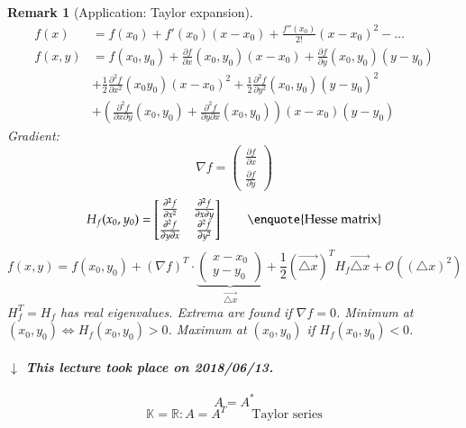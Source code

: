 \documentclass{article}
\newcounter{lecref}[section]
\numberwithin{lecref}{section}
\newtheorem{remark}[lecref]{Remark}
\newcommand{\dateref}[1]{%
  \begin{mdframed}[backgroundcolor=gray!10,innerbottommargin=0pt,innertopmargin=0pt]
    \paragraph{\textit{$\downarrow$ This lecture took place on #1.}}%
  \end{mdframed}%
}
\begin{document}
\begin{remark}[Application: Taylor expansion]
  \begin{align*}
    f(x) &= f(x_0) + f'(x_0)(x - x_0) + \frac{f''(x_0)}{2!} (x - x_0)^2 - \dots \\
    f(x,y) &= f(x_0, y_0) + \frac{\partial f}{\partial x} (x_0, y_0)(x - x_0) + \frac{\partial f}{\partial y} (x_0, y_0)(y - y_0) \\
      &+ \frac12 \frac{\partial^2 f}{\partial x^2} (x_0 y_0)(x - x_0)^2 + \frac12 \frac{\partial^2 f}{\partial y^2} (x_0, y_0) (y - y_0)^2 \\
      &+ \left(\frac{\partial^2 f}{\partial x \partial y} (x_0, y_0) + \frac{\partial^2 f}{\partial y \partial x} (x_0, y_0)\right) (x - x_0) (y - y_0)
  \end{align*}
  Gradient:
  \[ \nabla f = \begin{pmatrix} \frac{\partial f}{\partial x} \\ \frac{\partial f}{\partial y} \end{pmatrix} \]
  \[ H_f(x_0, y_0) = \begin{bmatrix}
      \frac{\partial^2 f}{\partial x^2} & \frac{\partial^2 f}{\partial x \partial y} \\
      \frac{\partial^2 f}{\partial y \partial x} & \frac{\partial^2 f}{\partial y^2}
    \end{bmatrix} \qquad \text{\enquote{Hesse matrix}}
  \] \[
    f(x, y) = f(x_0, y_0) + (\nabla f)^T \cdot \underbrace{\begin{pmatrix} x - x_0 \\ y - y_0 \end{pmatrix}}_{\vec{\triangle x}}
    + \frac12 (\vec{\triangle x})^T H_f \vec{\triangle x} + \mathcal O((\triangle x)^2)
  \]
  $H_f^T = H_f$ has real eigenvalues. Extrema are found if $\nabla f = 0$.
  Minimum at $(x_0, y_0) \iff H_f(x_0, y_0) > 0$. Maximum at $(x_0, y_0)$ if $H_f(x_0, y_0) < 0$.
\end{remark}

\dateref{2018/06/13}

\[ A = A^* \]
\[ \mathbb K = \mathbb R: A = A^T \qquad \text{Taylor series} \]
\end{document}
